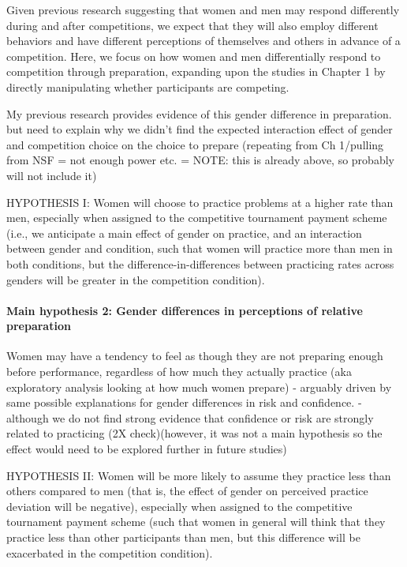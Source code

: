 \documentclass[a4paper, nobind]{templates/ociamthesis}
\begin{document}
Given previous research suggesting that women and men may respond differently during and after competitions, we expect that they will also employ different behaviors and have different perceptions of themselves and others in advance of a competition.
Here, we focus on how women and men differentially respond to competition through preparation, expanding upon the studies in Chapter 1 by directly manipulating whether participants are competing.

My previous research provides evidence of this gender difference in preparation. but need to explain why we didn't find the expected interaction effect of gender and competition choice on the choice to prepare (repeating from Ch 1/pulling from NSF = not enough power etc. = NOTE: this is already above, so probably will not include it)

HYPOTHESIS I: Women will choose to practice problems at a higher rate than men, especially when assigned to the competitive tournament payment scheme (i.e., we anticipate a main effect of gender on practice, and an interaction between gender and condition, such that women will practice more than men in both conditions, but the difference-in-differences between practicing rates across genders will be greater in the competition condition).

\hypertarget{main-hypothesis-2-gender-differences-in-perceptions-of-relative-preparation}{%
\paragraph{Main hypothesis 2: Gender differences in perceptions of relative preparation}\label{main-hypothesis-2-gender-differences-in-perceptions-of-relative-preparation}}

Women may have a tendency to feel as though they are not preparing enough before performance, regardless of how much they actually practice (aka exploratory analysis looking at how much women prepare) - arguably driven by same possible explanations for gender differences in risk and confidence. - although we do not find strong evidence that confidence or risk are strongly related to practicing (2X check)(however, it was not a main hypothesis so the effect would need to be explored further in future studies)

HYPOTHESIS II: Women will be more likely to assume they practice less than others compared to men (that is, the effect of gender on perceived practice deviation will be negative), especially when assigned to the competitive tournament payment scheme (such that women in general will think that they practice less than other participants than men, but this difference will be exacerbated in the competition condition).
\end{document}

